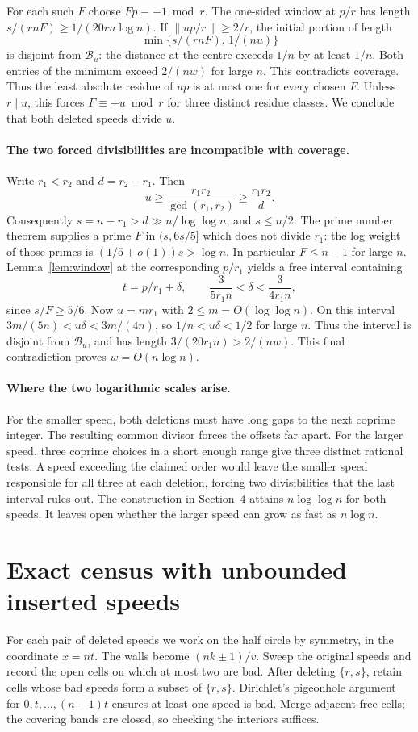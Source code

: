 \documentclass[11pt,a4paper]{article}
\newcommand{\dist}[1]{\lVert #1\rVert}
\newcommand{\bad}{\mathcal B}
\begin{document}
For each such $F$ choose $Fp\equiv-1\bmod r$. The one-sided window at
$p/r$ has length $s/(rnF)\ge1/(20rn\log n)$. If $\dist{up/r}\ge2/r$,
the initial portion of length
\[
 \min\{s/(rnF),\,1/(nu)\}
\]
is disjoint from $\bad_u$: the distance at the centre exceeds $1/n$
by at least $1/n$. Both entries of the minimum exceed $2/(nw)$ for large
$n$. This contradicts coverage. Thus the least absolute residue of $up$
is at most one for every chosen $F$. Unless $r\mid u$, this forces
$F\equiv\pm u\bmod r$ for three distinct residue classes. We conclude
that both deleted speeds divide $u$.

\newpage
\paragraph{The two forced divisibilities are incompatible with coverage.}
Write $r_1<r_2$ and $d=r_2-r_1$. Then
\[
 u\ge\frac{r_1r_2}{\gcd(r_1,r_2)}\ge\frac{r_1r_2}{d}.
\]
Consequently $s=n-r_1>d\gg n/\log\log n$, and $s\le n/2$.
The prime number theorem supplies a prime $F$ in $(s,6s/5]$
which does not divide $r_1$: the log weight of those primes is
$(1/5+o(1))s>\log n$. In particular $F\le n-1$ for large $n$.
Lemma~\ref{lem:window} at the corresponding $p/r_1$ yields a free
interval containing
\[
 t=p/r_1+\delta,\qquad
 \frac{3}{5r_1n}<\delta<\frac{3}{4r_1n},
\]
since $s/F\ge5/6$. Now $u=mr_1$ with $2\le m=O(\log\log n)$.
On this interval $3m/(5n)<u\delta<3m/(4n)$,
so $1/n<u\delta<1/2$ for large $n$. Thus the interval is disjoint
from $\bad_u$, and has length $3/(20r_1n)>2/(nw)$.
This final contradiction proves $w=O(n\log n)$.

\paragraph{Where the two logarithmic scales arise.}
For the smaller speed, both deletions must have long gaps to the next
coprime integer. The resulting common divisor forces the offsets far
apart. For the larger speed, three coprime choices in a short enough
range give three distinct rational tests. A speed exceeding the claimed
order would leave the smaller speed responsible for all three at each
deletion, forcing two divisibilities that the last interval rules out.
The construction in Section~4 attains $n\log\log n$ for both speeds.
It leaves open whether the larger speed can grow as fast as $n\log n$.

\newpage
\section{Exact census with unbounded inserted speeds}
For each pair of deleted speeds we work on the half circle by symmetry,
in the coordinate $x=nt$. The walls become $(nk\pm1)/v$. Sweep the
original speeds and record the open cells on which at most two are bad.
After deleting $\{r,s\}$, retain cells whose bad speeds form a subset of
$\{r,s\}$. Dirichlet's pigeonhole argument for $0,t,\ldots,(n-1)t$
ensures at least one speed is bad. Merge adjacent free cells; the covering
bands are closed, so checking the interiors suffices.
\end{document}
